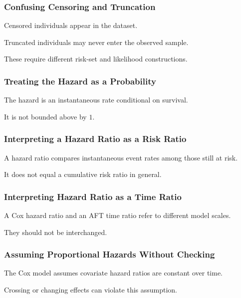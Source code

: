 \subsubsection{Confusing Censoring and Truncation}

Censored individuals appear in the dataset.

Truncated individuals may never enter the observed sample.

These require different risk-set and likelihood constructions.

\subsubsection{Treating the Hazard as a Probability}

The hazard is an instantaneous rate conditional on survival.

It is not bounded above by \(1\).

\subsubsection{Interpreting a Hazard Ratio as a Risk Ratio}

A hazard ratio compares instantaneous event rates among those still at
risk.

It does not equal a cumulative risk ratio in general.

\subsubsection{Interpreting Hazard Ratio as a Time Ratio}

A Cox hazard ratio and an AFT time ratio refer to different model scales.

They should not be interchanged.

\subsubsection{Assuming Proportional Hazards Without Checking}

The Cox model assumes covariate hazard ratios are constant over time.

Crossing or changing effects can violate this assumption.


